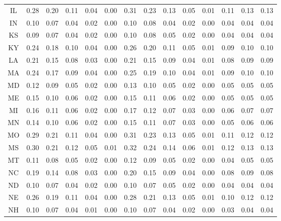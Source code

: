 \begin{table}
\begin{tabular}{cccccccccccccc}
   IL &  0.28 &  0.20 &  0.11 &  0.04 &  0.00 &  0.31 &  0.23 &  0.13 &  0.05 &  0.01 &    0.11 &     0.13 &      0.13 \\
   IN &  0.10 &  0.07 &  0.04 &  0.02 &  0.00 &  0.10 &  0.08 &  0.04 &  0.02 &  0.00 &    0.04 &     0.04 &      0.04 \\
   KS &  0.09 &  0.07 &  0.04 &  0.02 &  0.00 &  0.10 &  0.08 &  0.05 &  0.02 &  0.00 &    0.04 &     0.04 &      0.04 \\
   KY &  0.24 &  0.18 &  0.10 &  0.04 &  0.00 &  0.26 &  0.20 &  0.11 &  0.05 &  0.01 &    0.09 &     0.10 &      0.10 \\
   LA &  0.21 &  0.15 &  0.08 &  0.03 &  0.00 &  0.21 &  0.15 &  0.09 &  0.04 &  0.01 &    0.08 &     0.09 &      0.09 \\
   MA &  0.24 &  0.17 &  0.09 &  0.04 &  0.00 &  0.25 &  0.19 &  0.10 &  0.04 &  0.01 &    0.09 &     0.10 &      0.10 \\
   MD &  0.12 &  0.09 &  0.05 &  0.02 &  0.00 &  0.13 &  0.10 &  0.05 &  0.02 &  0.00 &    0.05 &     0.05 &      0.05 \\
   ME &  0.15 &  0.10 &  0.06 &  0.02 &  0.00 &  0.15 &  0.11 &  0.06 &  0.02 &  0.00 &    0.05 &     0.05 &      0.05 \\
   MI &  0.16 &  0.11 &  0.06 &  0.02 &  0.00 &  0.17 &  0.12 &  0.07 &  0.03 &  0.00 &    0.06 &     0.07 &      0.07 \\
   MN &  0.14 &  0.10 &  0.06 &  0.02 &  0.00 &  0.15 &  0.11 &  0.07 &  0.03 &  0.00 &    0.05 &     0.06 &      0.06 \\
   MO &  0.29 &  0.21 &  0.11 &  0.04 &  0.00 &  0.31 &  0.23 &  0.13 &  0.05 &  0.01 &    0.11 &     0.12 &      0.12 \\
   MS &  0.30 &  0.21 &  0.12 &  0.05 &  0.01 &  0.32 &  0.24 &  0.14 &  0.06 &  0.01 &    0.12 &     0.13 &      0.13 \\
   MT &  0.11 &  0.08 &  0.05 &  0.02 &  0.00 &  0.12 &  0.09 &  0.05 &  0.02 &  0.00 &    0.04 &     0.05 &      0.05 \\
   NC &  0.19 &  0.14 &  0.08 &  0.03 &  0.00 &  0.20 &  0.15 &  0.09 &  0.04 &  0.00 &    0.08 &     0.09 &      0.08 \\
   ND &  0.10 &  0.07 &  0.04 &  0.02 &  0.00 &  0.10 &  0.07 &  0.05 &  0.02 &  0.00 &    0.04 &     0.04 &      0.04 \\
   NE &  0.26 &  0.19 &  0.11 &  0.04 &  0.00 &  0.28 &  0.21 &  0.13 &  0.05 &  0.01 &    0.10 &     0.12 &      0.12 \\
   NH &  0.10 &  0.07 &  0.04 &  0.01 &  0.00 &  0.10 &  0.07 &  0.04 &  0.02 &  0.00 &    0.03 &     0.04 &      0.04 \\

\end{tabular}
\end{table}

